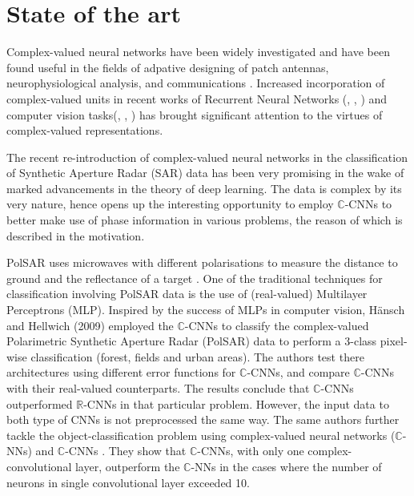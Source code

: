 \chapter{State of the art}\label{chap:comp}

Complex-valued neural networks have been widely investigated and have been found useful in the fields of adpative designing of patch antennas, neurophysiological analysis, and communications \cite{hirose2012complex}. Increased incorporation of complex-valued units in recent works of Recurrent Neural Networks (\cite{ArjovskySB15}, \cite{wisdom2016full}, \cite{danihelka2016associative}) and computer vision tasks(\cite{oyallon2015deep}, \cite{bruna2015theoretical}, \cite{worrall2017harmonic}) has brought significant attention to the virtues of complex-valued representations. 


The recent re-introduction of complex-valued neural networks in the classification of Synthetic Aperture Radar (SAR) data has been very promising in the wake of marked advancements in the theory of deep learning. The data is complex by its very nature, hence opens up the interesting opportunity to employ $\mathbb{C}$-CNNs to better make use of phase information in various problems, the reason of which is described in the motivation.

PolSAR uses microwaves with different polarisations to measure
the distance to ground and the reflectance of a target \cite{hansch2009classification}. One of the traditional techniques for classification involving PolSAR data is the use of (real-valued) Multilayer Perceptrons (MLP). Inspired by the success of MLPs in computer vision, H\"{a}nsch and Hellwich (2009) \cite{hansch2009classification} employed the $\mathbb{C}$-CNNs to classify the complex-valued Polarimetric Synthetic Aperture Radar (PolSAR) data to perform a 3-class pixel-wise classification (forest, fields and urban areas). The authors test there architectures using different error functions for $\mathbb{C}$-CNNs, and compare $\mathbb{C}$-CNNs with their real-valued counterparts. The results conclude that $\mathbb{C}$-CNNs outperformed $\mathbb{R}$-CNNs in that particular problem. However, the input data to both type of CNNs is not preprocessed the same way. The same authors further tackle the object-classification problem using complex-valued neural networks ($\mathbb{C}$-NNs) and $\mathbb{C}$-CNNs \cite{hansch2010complex}. They show that $\mathbb{C}$-CNNs, with only one complex-convolutional layer, outperform the $\mathbb{C}$-NNs in the cases where the number of neurons in single convolutional layer exceeded 10. 

